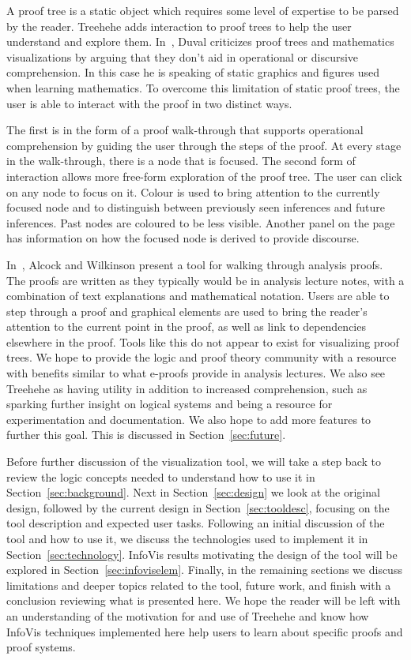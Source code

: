 \documentclass[journal]{vgtc}                %
\newcommand{\projectname}{Treehehe}
\begin{document}
A proof tree is a static object which requires some level of expertise to be parsed by the reader. \projectname{} adds interaction to proof trees to help the user understand and explore them. In~\cite{repvisvis-duval}, Duval criticizes proof trees and mathematics visualizations by arguing that they don’t aid in operational or discursive comprehension. In this case he is speaking of static graphics and figures used when learning mathematics. To overcome this limitation of static proof trees, the user is able to interact with the proof in two distinct ways.

The first is in the form of a proof walk-through that supports operational comprehension by guiding the user through the steps of the proof. At every stage in the walk-through, there is a node that is focused. The second form of interaction allows more free-form exploration of the proof tree. The user can click on any node to focus on it. Colour is used to bring attention to the currently focused node and to distinguish between previously seen inferences and future inferences. Past nodes are coloured to be less visible. Another panel on the page has information on how the focused node is derived to provide discourse.

In~\cite{eproofs-alcock+wilkinson}, Alcock and Wilkinson present a tool for walking through analysis proofs. The proofs are written as they typically would be in analysis lecture notes, with a combination of text explanations and mathematical notation. Users are able to step through a proof and graphical elements are used to bring the reader's attention to the current point in the proof, as well as link to dependencies elsewhere in the proof. Tools like this do not appear to exist for visualizing proof trees. We hope to provide the logic and proof theory community with a resource with benefits similar to what e-proofs provide in analysis lectures. We also see \projectname{} as having utility in addition to increased comprehension, such as sparking further insight on logical systems and being a resource for experimentation and documentation. We also hope to add more features to further this goal. This is discussed in Section~\ref{sec:future}.

Before further discussion of the visualization tool, we will take a step back to review the logic concepts needed to understand how to use it in Section~\ref{sec:background}. Next in Section~\ref{sec:design} we look at the original design, followed by the current design in Section~\ref{sec:tooldesc}, focusing on the tool description and expected user tasks. Following an initial discussion of the tool and how to use it, we discuss the technologies used to implement it in Section~\ref{sec:technology}. InfoVis results motivating the design of the tool will be explored in Section~\ref{sec:infoviselem}. Finally, in the remaining sections we discuss limitations and deeper topics related to the tool, future work, and finish with a conclusion reviewing what is presented here. We hope the reader will be left with an understanding of the motivation for and use of \projectname{} and know how InfoVis techniques implemented here help users to learn about specific proofs and proof systems.
\end{document}
